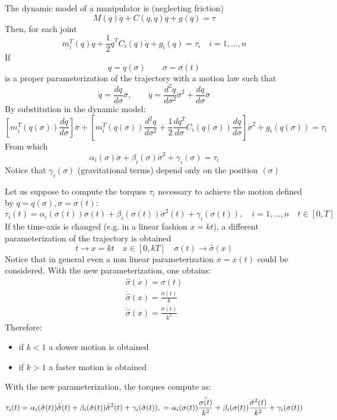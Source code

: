 \documentclass{book}
\begin{document}
The dynamic model of a manipulator is (neglecting friction)
\[
    M(q)\ddot{q} +C(q,\dot{q})\dot{q}+g(q)=\tau
\]
Then, for each joint 
\[
    m_i^T(q)\ddot{q}+\displaystyle\frac{1}{2}\dot{q}^TC_i(q)\dot{q}+g_i(q)=\tau_i \quad i=1,\dots,n
\]
If 
\[
    q=q(\sigma) \qquad \sigma=\sigma(t)
\]
is a proper parameterization of the trajectory with a motion law such that 
\[
    \dot{q}=\displaystyle\frac{dq}{d\sigma}\dot{\sigma}, \qquad \ddot{q}=\displaystyle\frac{d^2q}{d\sigma^2}\dot{\sigma}^2 + \displaystyle\frac{dq}{d\sigma}\ddot{\sigma}
\]
By substitution in the dynamic model: 
\[
\left[m_i^T(q(\sigma))\displaystyle\frac{dq}{d\sigma}\right] \ddot{\sigma}+\left[m_i^T(q(\sigma))\displaystyle\frac{d^2q}{d\sigma^2}+\displaystyle\frac{1}{2}\displaystyle\frac{dq^T}{d\sigma}C_i(q(\sigma))\displaystyle\frac{dq}{d\sigma}\right]\dot{\sigma}^2+g_i(q(\sigma))=\tau_i
\]
From which 
\[
    \alpha_i(\sigma)\ddot{\sigma}+\beta_i(\sigma)\dot{\sigma}^2+\gamma_i(\sigma)=\tau_i
\]
Notice that $\gamma_i(\sigma)$ (gravitational terms) depend only on the position $(\sigma)$

Let us suppose to compute the torques $\tau_i$ necessary to achieve the motion defined by $q=q(\sigma),\sigma=\sigma(t)$: 
\[
    \tau_i(t)=\alpha_i(\sigma(t))\ddot{\sigma}(t)+\beta_i(\sigma(t))\dot{\sigma}^2(t)+\gamma_i(\sigma(t)),\quad i=1,\dots,n \quad t \in [0,T]
\]
If the time-axis is changed (e.g. in a linear fashion $x=kt$), a different parameterization of the trajectory is obtained 
\[
    t\to x=kt \quad x\in[0,kT] \quad \sigma(t)\to\hat{\sigma}(x)
\]
Notice that in general even a non linear parameterization $x=x(t)$ could be considered. With the new  parameterization, one obtains: 
\begin{gather*}
    \hat{\sigma}(x)=\sigma(t)\\
    \dot{\hat{\sigma}}(x)=\displaystyle\frac{\dot{\sigma}(t)}{k}\\
    \ddot{\hat{\sigma}}(x)=\displaystyle\frac{\ddot{\sigma}(t)}{k^2}
\end{gather*}
Therefore: 
\begin{itemize}
    \item if $k<1$ a slower motion is obtained 
    \item if $k>1$ a faster motion is obtained
\end{itemize}
With the new parameterization, the torques compute as: 
\[
    \tau_i(t)=\alpha_i(\hat{\sigma}(t))\ddot{\hat{\sigma}}(t)+\beta_i(\hat{\sigma}(t))\dot{\hat{\sigma}}^2(t)+\gamma_i(\hat{\sigma}(t)),\quad \\
    = \alpha_i(\sigma(t))\displaystyle\frac{\ddot{\sigma(t)}}{k^2}+\beta_i(\sigma(t))\displaystyle\frac{\dot{\sigma}^2(t)}{k^2}+\gamma_i(\sigma(t))
\]
\end{document}
